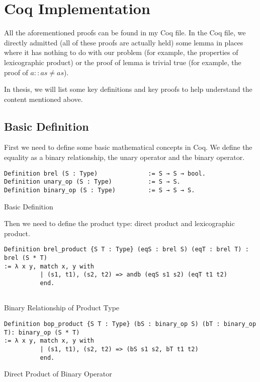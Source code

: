 \section{Coq Implementation}
All the aforementioned proofs can be found in my Coq file.
In the Coq file, we directly admitted (all of these proofs are actually held) some lemma in places where it has nothing to do with our problem (for example, the properties of lexicographic product) or the proof of lemma is trivial true (for example, the proof of $a::as \neq as$).

In thesis, we will list some key definitions and key proofs to help understand the content mentioned above.

\subsection{Basic Definition}
First we need to define some basic mathematical concepts in Coq. We define the equality as a binary relationship, the unary operator and the binary operator.
\begin{listing}[H]
\begin{verbatim}
Definition brel (S : Type)              := S → S → bool.
Definition unary_op (S : Type)          := S → S. 
Definition binary_op (S : Type)         := S → S → S. 
\end{verbatim}
\caption{Basic Definition} 
\label{coq:def:basic}
\end{listing}

Then we need to define the product type: direct product and lexicographic product.
\begin{listing}[H]
\begin{verbatim}
Definition brel_product {S T : Type} (eqS : brel S) (eqT : brel T) : brel (S * T)
:= λ x y, match x, y with
          | (s1, t1), (s2, t2) => andb (eqS s1 s2) (eqT t1 t2) 
          end.
        
\end{verbatim}
\caption{Binary Relationship of Product Type} 
\label{coq:def:product_relationship}
\end{listing}

\begin{listing}[H]
\begin{verbatim}
Definition bop_product {S T : Type} (bS : binary_op S) (bT : binary_op T): binary_op (S * T) 
:= λ x y, match x, y with
          | (s1, t1), (s2, t2) => (bS s1 s2, bT t1 t2) 
          end.
\end{verbatim}
\caption{Direct Product of Binary Operator} 
\label{coq:def:direct_product}
\end{listing}

